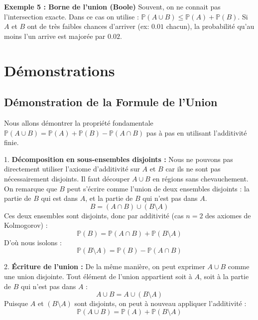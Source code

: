 \documentclass[11pt,a4paper]{article}
\begin{document}
\textbf{Exemple 5 : Borne de l'union (Boole)}
Souvent, on ne connait pas l'intersection exacte. Dans ce cas on utilise :
$\mathbb{P}(A \cup B) \le \mathbb{P}(A) + \mathbb{P}(B)$. Si $A$ et $B$ ont de très faibles chances d'arriver (ex: $0.01$ chacun), la probabilité qu'au moins l'un arrive est majorée par $0.02$.

\begin{center}
\end{center}

\section{Démonstrations}

\subsection{Démonstration de la Formule de l'Union}

Nous allons démontrer la propriété fondamentale $\mathbb{P}(A \cup B) = \mathbb{P}(A) + \mathbb{P}(B) - \mathbb{P}(A \cap B)$ pas à pas en utilisant l'additivité finie.

1. \textbf{Décomposition en sous-ensembles disjoints :}
   Nous ne pouvons pas directement utiliser l'axiome d'additivité sur $A$ et $B$ car ils ne sont pas nécessairement disjoints. Il faut découper $A \cup B$ en régions sans chevauchement.
   On remarque que $B$ peut s'écrire comme l'union de deux ensembles disjoints : la partie de $B$ qui est dans $A$, et la partie de $B$ qui n'est pas dans $A$.
   $$B = (A \cap B) \cup (B \setminus A)$$
   Ces deux ensembles sont disjoints, donc par additivité (cas $n=2$ des axiomes de Kolmogorov) :
   $$\mathbb{P}(B) = \mathbb{P}(A \cap B) + \mathbb{P}(B \setminus A)$$
   D'où nous isolons :
   $$\mathbb{P}(B \setminus A) = \mathbb{P}(B) - \mathbb{P}(A \cap B)$$

2. \textbf{Écriture de l'union :}
   De la même manière, on peut exprimer $A \cup B$ comme une union disjointe. Tout élément de l'union appartient soit à $A$, soit à la partie de $B$ qui n'est pas dans $A$ :
   $$A \cup B = A \cup (B \setminus A)$$
   Puisque $A$ et $(B \setminus A)$ sont disjoints, on peut à nouveau appliquer l'additivité :
   $$\mathbb{P}(A \cup B) = \mathbb{P}(A) + \mathbb{P}(B \setminus A)$$
\end{document}
